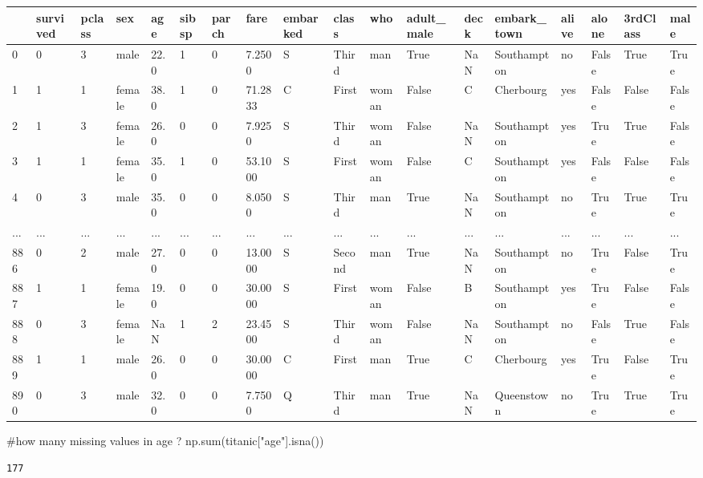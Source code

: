 \documentclass[
  letterpaper,
  DIV=11,
  numbers=noendperiod]{scrreprt}
\newenvironment{Shaded}{\begin{snugshade}}{\end{snugshade}}
\newcommand{\BuiltInTok}[1]{\textcolor[rgb]{0.00,0.23,0.31}{#1}}
\newcommand{\CommentTok}[1]{\textcolor[rgb]{0.37,0.37,0.37}{#1}}
\newcommand{\NormalTok}[1]{\textcolor[rgb]{0.00,0.23,0.31}{#1}}
\newcommand{\StringTok}[1]{\textcolor[rgb]{0.13,0.47,0.30}{#1}}
\begin{document}
\begin{longtable}[]{@{}llllllllllllllllll@{}}
\toprule()
& survived & pclass & sex & age & sibsp & parch & fare & embarked &
class & who & adult\_male & deck & embark\_town & alive & alone &
3rdClass & male \\
\midrule()
\endhead
0 & 0 & 3 & male & 22.0 & 1 & 0 & 7.2500 & S & Third & man & True & NaN
& Southampton & no & False & True & True \\
1 & 1 & 1 & female & 38.0 & 1 & 0 & 71.2833 & C & First & woman & False
& C & Cherbourg & yes & False & False & False \\
2 & 1 & 3 & female & 26.0 & 0 & 0 & 7.9250 & S & Third & woman & False &
NaN & Southampton & yes & True & True & False \\
3 & 1 & 1 & female & 35.0 & 1 & 0 & 53.1000 & S & First & woman & False
& C & Southampton & yes & False & False & False \\
4 & 0 & 3 & male & 35.0 & 0 & 0 & 8.0500 & S & Third & man & True & NaN
& Southampton & no & True & True & True \\
... & ... & ... & ... & ... & ... & ... & ... & ... & ... & ... & ... &
... & ... & ... & ... & ... & ... \\
886 & 0 & 2 & male & 27.0 & 0 & 0 & 13.0000 & S & Second & man & True &
NaN & Southampton & no & True & False & True \\
887 & 1 & 1 & female & 19.0 & 0 & 0 & 30.0000 & S & First & woman &
False & B & Southampton & yes & True & False & False \\
888 & 0 & 3 & female & NaN & 1 & 2 & 23.4500 & S & Third & woman & False
& NaN & Southampton & no & False & True & False \\
889 & 1 & 1 & male & 26.0 & 0 & 0 & 30.0000 & C & First & man & True & C
& Cherbourg & yes & True & False & True \\
890 & 0 & 3 & male & 32.0 & 0 & 0 & 7.7500 & Q & Third & man & True &
NaN & Queenstown & no & True & True & True \\
\bottomrule()
\end{longtable}

\begin{Shaded}
\begin{Highlighting}[]
\CommentTok{\#how many missing values in age ?}
\NormalTok{np.}\BuiltInTok{sum}\NormalTok{(titanic[}\StringTok{"age"}\NormalTok{].isna())}
\end{Highlighting}
\end{Shaded}

\begin{verbatim}
177
\end{verbatim}
\end{document}
